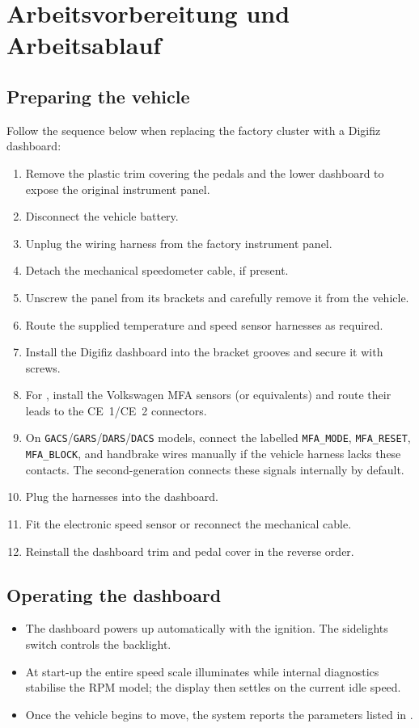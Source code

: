 \chapter{Arbeitsvorbereitung und Arbeitsablauf}\label{ch:preparation}

\section{Preparing the vehicle}
Follow the sequence below when replacing the factory cluster with a Digifiz dashboard:
\begin{enumerate}
    \item Remove the plastic trim covering the pedals and the lower dashboard to expose the original instrument panel.
    \item Disconnect the vehicle battery.
    \item Unplug the wiring harness from the factory instrument panel.
    \item Detach the mechanical speedometer cable, if present.
    \item Unscrew the panel from its brackets and carefully remove it from the vehicle.
    \item Route the supplied temperature and speed sensor harnesses as required.
    \item Install the Digifiz dashboard into the bracket grooves and secure it with screws.
    \item For \ReplicaNextLong{}, install the Volkswagen MFA sensors (or equivalents) and route their leads to the CE~1/CE~2 connectors.
    \item On \texttt{GACS}/\texttt{GARS}/\texttt{DARS}/\texttt{DACS} models, connect the labelled \texttt{MFA\_MODE}, \texttt{MFA\_RESET}, \texttt{MFA\_BLOCK}, and handbrake wires manually if the vehicle harness lacks these contacts. The second-generation \ReplicaNextShort{} connects these signals internally by default.
    \item Plug the harnesses into the dashboard.
    \item Fit the electronic speed sensor or reconnect the mechanical cable.
    \item Reinstall the dashboard trim and pedal cover in the reverse order.
\end{enumerate}

\section{Operating the dashboard}
\begin{itemize}
    \item The dashboard powers up automatically with the ignition. The sidelights switch controls the backlight.
    \item At start-up the entire speed scale illuminates while internal diagnostics stabilise the RPM model; the display then settles on the current idle speed.
    \item Once the vehicle begins to move, the system reports the parameters listed in .
\end{itemize}


